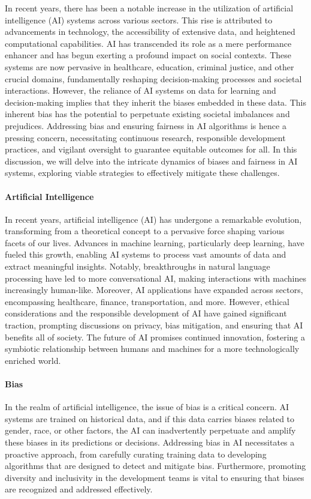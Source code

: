 \documentclass[12pt,a4paper,openright,twoside]{book}
\begin{document}
In recent years, there has been a notable increase in the utilization of artificial intelligence (AI) systems across various sectors. This rise is attributed to advancements in technology, the accessibility of extensive data, and heightened computational capabilities. AI has transcended its role as a mere performance enhancer and has begun exerting a profound impact on social contexts. These systems are now pervasive in healthcare, education, criminal justice, and other crucial domains, fundamentally reshaping decision-making processes and societal interactions. However, the reliance of AI systems on data for learning and decision-making implies that they inherit the biases embedded in these data. This inherent bias has the potential to perpetuate existing societal imbalances and prejudices. Addressing bias and ensuring fairness in AI algorithms is hence a pressing concern, necessitating continuous research, responsible development practices, and vigilant oversight to guarantee equitable outcomes for all. In this discussion, we will delve into the intricate dynamics of biases and fairness in AI systems, exploring viable strategies to effectively mitigate these challenges.

\paragraph{Artificial Intelligence}
In recent years, artificial intelligence (AI) has undergone a remarkable evolution, transforming from a theoretical concept to a pervasive force shaping various facets of our lives. Advances in machine learning, particularly deep learning, have fueled this growth, enabling AI systems to process vast amounts of data and extract meaningful insights. Notably, breakthroughs in natural language processing have led to more conversational AI, making interactions with machines increasingly human-like. Moreover, AI applications have expanded across sectors, encompassing healthcare, finance, transportation, and more. However, ethical considerations and the responsible development of AI have gained significant traction, prompting discussions on privacy, bias mitigation, and ensuring that AI benefits all of society. The future of AI promises continued innovation, fostering a symbiotic relationship between humans and machines for a more technologically enriched world.
\paragraph{Bias}
In the realm of artificial intelligence, the issue of bias is a critical concern. AI systems are trained on historical data, and if this data carries biases related to gender, race, or other factors, the AI can inadvertently perpetuate and amplify these biases in its predictions or decisions. Addressing bias in AI necessitates a proactive approach, from carefully curating training data to developing algorithms that are designed to detect and mitigate bias. Furthermore, promoting diversity and inclusivity in the development teams is vital to ensuring that biases are recognized and addressed effectively.
\end{document}
